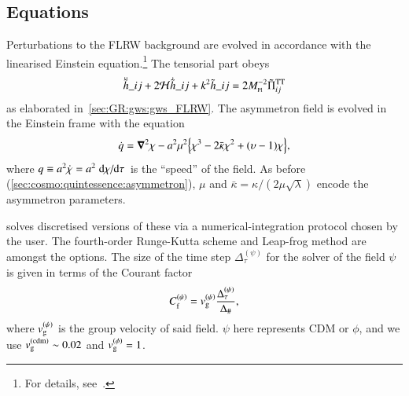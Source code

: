 \subsection{Equations}

    Perturbations to the FLRW background are evolved in accordance with the linearised Einstein equation.\footnote{For details, see~\citet{adamekGevolutionCosmologicalNbody2016}.} %
    The tensorial part obeys 
    \begin{equation}
        \ddot{\Ft{h}}\_{ij} + 2\mathcal{H} \dot{\Ft{h}}\_{ij} + k^2 \Ft{h}\_{ij} =  2M\nped{Pl}^{-2} \Ft{\Pi}\indices*{^{\mathrm{TT}}_{ij}}
    \end{equation}
    as elaborated in~\cref{sec:GR:gws:gws_FLRW}. %
    The asymmetron field is evolved in the Einstein frame with the equation
    \begin{equation}
        \dot{q} = \boldsymbol{\nabla}^2 \chi - a^2 \mu^2 {\left\{ \chi^3 - 2\bar{\kappa} \chi^2 + (\upsilon-1) \chi \right\}},
    \end{equation}
    where $q\equiv a^2 \dot{\chi}=a^2 \dv*{\chi}{\tau}$ is the ``speed'' of the field. As before (\cref{sec:cosmo:quintessence:asymmetron}), $\mu$ and $\bar{\kappa}=\kappa /(2\mu\sqrt{\lambda})$ encode the asymmetron parameters. 



    \asgrd{} solves discretised versions of these via a numerical-integration protocol chosen by the user. The fourth-order Runge-Kutta scheme and Leap-frog method are amongst the options. %
    The size of the time step $\Delta_\tau^{(\psi)}$ for the solver of the field $\psi$ is given in terms of the Courant factor~\citep{christiansenAsimulationDomainFormation2024}
    \begin{equation}
        C_\mathrm{f}^{(\psi)} = v_\mathrm{g}^{(\psi)} \frac{\Delta_\tau^{(\psi)}}{\Delta_\#},
    \end{equation}
    where $ v_\mathrm{g}^{(\psi)}$ is the group velocity of said field. $\psi$ here represents CDM or $\phi$, and we use $v_\mathrm{g}^\mathrm{(cdm)}\sim 0.02$ and $v_\mathrm{g}^{(\phi)}= 1$. 








